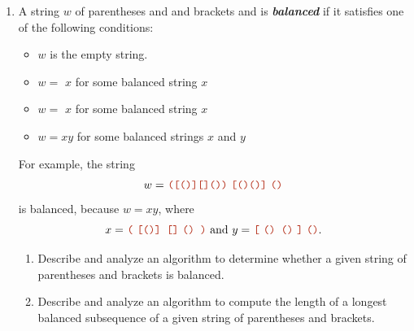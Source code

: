 \begin{enumerate}[label=\arabic*.,ref=\thechapter.\arabic*,leftmargin=*,align=left,widest*=99,itemsep=1.5ex plus 0.5ex,resume]
\[\begin{array}{ccccccccc}
\end{array}
\]
Here $T_i$ is the subtree pointed to by $\Var{child}[i]$.
The \textbf{\textit{cost}} of searching for a key $x$ in a $B$-tree is the number of nodes in the path from the root to the node containing $x$ as one of its keys.
A $1$-tree is just a standard binary search tree.
Fix an arbitrary positive integer $B>0$.
(I suggest $B=8$.)
Suppose your are given a sorted array $A[1,...,n]$ of search keys and a corresponding array $F[1,...,n]$ of frequency counts, where $F[i]$ is the number of times that we will search for $A[i]$.
Your task is to describe and analyze an efficient algorithm to find a $B$-tree that minimizes the total cost of searching for the given keys with the given frequencies.
\begin{enumerate}
\item Describe a polynomial-time algorithm for the special case $B=2$.
\item Describe an algorithm for arbitrary $B$ that runs in $O(n^{B+c})$ time for some fixed integer $c$.
\item {} Describe an algorithm for arbitrary $B$ that runs in $O(n^c)$ time for some fixed integer $c$ that does \textit{not} depend on $B$.
\end{enumerate}
\item A string $w$ of parentheses \Str{(} and \Str{)} and brackets \Str{[} and \Str{]} is \textbf{\textit{balanced}} if it satisfies one of the following conditions:
\begin{itemize}
\item $w$ is the empty string.
\item $w=$ \Str{(}$x$\Str{)} for some balanced string $x$
\item $w=$ \Str{[}$x$\Str{]} for some balanced string $x$
\item $w=x y$ for some balanced strings $x$ and $y$
\end{itemize}
For example, the string
\[
\mbox{$w=$ \Str{(}\Str{[}\Str{()}\Str{][]}\Str{())} \Str{[}\Str{()()}\Str{]} \Str{()}}
\]
is balanced, because $w=x y$, where
\[
\mbox{$x=$ \Str{(} \Str{[}\Str{()}\Str{] []} \Str{() )} and $y=$ \Str{[} \Str{() ()} \Str{]} \Str{()}$.$}
\]
\begin{enumerate}
\item Describe and analyze an algorithm to determine whether a given string of parentheses and brackets is balanced.
\item Describe and analyze an algorithm to compute the length of a longest balanced subsequence of a given string of parentheses and brackets.

\end{enumerate}
\end{enumerate}
